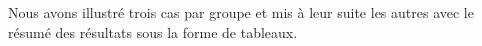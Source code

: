  Nous avons illustré trois cas par groupe  et mis à leur suite les autres avec le résumé des 
 résultats 
 sous la forme de tableaux.
 
 
 
 











